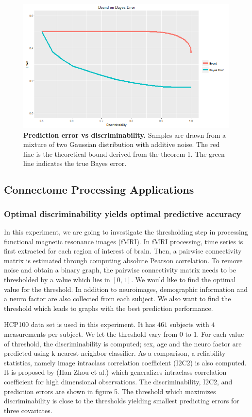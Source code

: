 \documentclass{article}
\begin{document}
\begin{figure}[ht!]
	\includegraphics[width=\linewidth]{../Figs/theo_plot.png}
	\caption{{\bf Prediction error vs discriminability.} Samples are drawn from a mixture of two Gaussian distribution with additive noise. The red line is the theoretical bound derived from the theorem 1. The green line indicates the true Bayes error. }
	\label{fig:1}
\end{figure}

\subsection{Connectome Processing Applications}

\subsubsection{Optimal discriminability yields optimal predictive accuracy}
In this experiment, we are going to investigate the thresholding step in processing functional magnetic resonance images (fMRI). In fMRI processing, time series is first extracted for each region of interest of brain. Then, a pairwise connectivity matrix is estimated through computing absolute Pearson correlation. To remove noise and obtain a binary graph, the pairwise connectivity matrix needs to be thresholded by a value which lies in $[0,1]$. We would like to find the optimal value for the threshold. In addition to neuroimages, demographic information and a neuro factor are also collected from each subject. We also want to find the threshold which leads to graphs with the best prediction performance.  

HCP100 data set is used in this experiment. It has $461$ subjects with $4$ measurements per subject. We let the threshold vary from 0 to 1. For each value of threshold, the discriminability is computed; sex, age and the neuro factor are predicted using k-nearest neighbor classifier. As a comparison, a reliability statistics, namely image intraclass correlation coefficient (I2C2) is also computed. It is proposed by (Han Zhou et al.) which generalizes intraclass correlation coefficient for high dimensional observations. The discriminability, I2C2, and prediction errors are shown in figure 5. The threshold which maximizes discriminability is close to the thresholds yielding smallest predicting errors for three covariates. 
\end{document}

